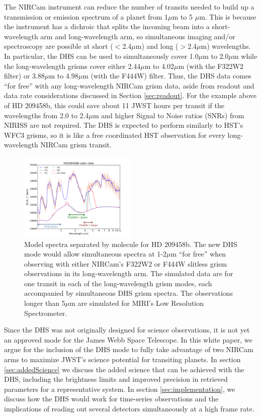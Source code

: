 \documentclass[iop]{emulateapj}
\begin{document}
The NIRCam instrument can reduce the number of transits needed to build up a transmission or emission spectrum of a planet from 1$\mu$m to 5 $\mu$m.
This is because the instrument has a dichroic that splits the incoming beam into a short-wavelength arm and long-wavelength arm, so simultaneous imaging and/or spectroscopy are possible at short ($<$2.4$\mu$m) and long ($>$2.4$\mu$m) wavelengths.
In particular, the DHS can be used to simultaneously cover 1.0$\mu$m to 2.0$\mu$m while the long-wavelength grisms cover either 2.44$\mu$m to 4.02$\mu$m (with the F322W2 filter) or 3.88$\mu$m to 4.98$\mu$m (with the F444W) filter.
Thus, the DHS data comes ``for free'' with any long-wavelength NIRCam grism data, aside from readout and data rate considerations discussed in Section \ref{sec:readout}.
For the example above of HD 209458b, this could save about 11 JWST hours per transit if the wavelengths from 2.0 to 2.4$\mu$m and higher Signal to Noise ratios (SNRs) from NIRISS are not required.
The DHS is expected to perform similarly to HST's WFC3 grisms, so it is like a free coordinated HST observation for every long-wavelength NIRCam grism transit.

\begin{figure}[!ht]
\includegraphics[width=0.5\textwidth]{molecules_DHS_HD209.pdf}
\caption{Model spectra separated by molecule for HD 209458b.
The new DHS mode would allow simultaneous spectra at 1-2$\mu$m ``for free'' when observing with either NIRCam's F322W2 or F444W slitless grism observations in its long-wavelength arm.
The simulated data are for one transit in each of the long-wavelength grism modes, each accompanied by simultaneous DHS grism spectra.
The observations longer than 5$\mu$m are simulated for MIRI's Low Resolution Spectrometer.}\label{fig:DHSmolecules}
\end{figure}

Since the DHS was not originally designed for science observations, it is not yet an approved mode for the James Webb Space Telescope.
In this white paper, we argue for the inclusion of the DHS mode to fully take advantage of two NIRCam arms to maximize JWST's science potential for transiting planets.
In section \ref{sec:addedScience} we discuss the added science that can be achieved with the DHS, including the brightness limits and improved precision in retrieved parameters for a representative system.
In section \ref{sec:implementation}, we discuss how the DHS would work for time-series observations and the implications of reading out several detectors simultaneously at a high frame rate.
\end{document}
